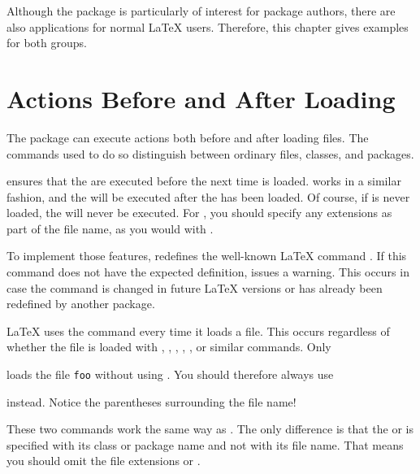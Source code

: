 Although the package is particularly of interest for package authors, there
are also applications for normal \LaTeX{} users.  Therefore, this chapter
gives examples for both groups.


\section{Actions Before and After Loading}

The  package can execute actions both before and after
loading files. The commands used to do so distinguish between ordinary files,
classes, and packages.

\begin{Declaration}
\end{Declaration}%
 ensures that the  are executed before the
next time  is loaded.  works in a similar
fashion, and the  will be executed after the  has
been loaded. Of course, if  is never loaded, the 
will never be executed. For , you should specify any extensions as
part of the file name, as you would with .

To implement those features,  redefines the well-known
\LaTeX{} command . If this command does not have the
expected definition,  issues a warning. This occurs in case
the command is changed in future \LaTeX{} versions or has already been
redefined by another package.

\LaTeX{} uses the  command every time it loads a
file. This occurs regardless of whether the file is loaded with
, , , ,
, or similar commands. Only
\begin{lstcode}
  
\end{lstcode}
loads the file \texttt{foo} without using
. You should therefore always use
\begin{lstcode}
  
\end{lstcode}
instead. Notice the parentheses surrounding the file name!%
%
\EndIndexGroup


\begin{Declaration}
\end{Declaration}%
These two commands work the same way as .
The only difference is that the  or  is specified
with its class or package name and not with its file name. That means you
should omit the file extensions  or .%
%
\EndIndexGroup


